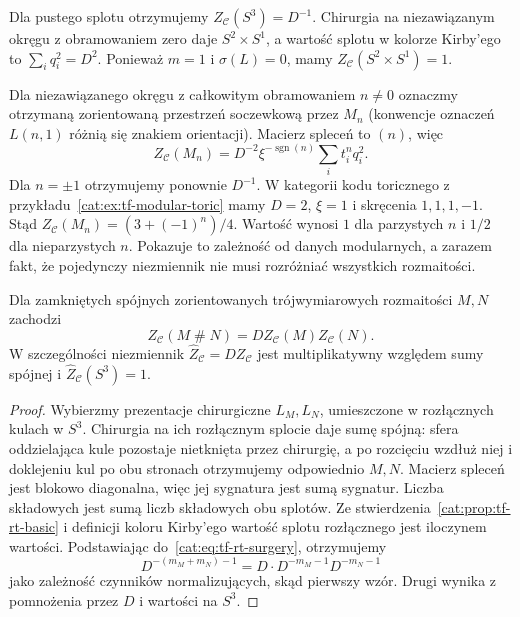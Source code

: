 \begin{przyklad}\label{cat:ex:tf-rt-lens}
Dla pustego splotu otrzymujemy $Z_{\mathcal C}(S^3)=D^{-1}$. Chirurgia na niezawiązanym okręgu z obramowaniem zero daje $S^2\times S^1$, a wartość splotu w kolorze Kirby'ego to $\sum_i q_i^2=D^2$. Ponieważ $m=1$ i $\sigma(L)=0$, mamy $Z_{\mathcal C}(S^2\times S^1)=1$.

Dla niezawiązanego okręgu z całkowitym obramowaniem $n\neq0$ oznaczmy otrzymaną zorientowaną przestrzeń soczewkową przez $M_n$ (konwencje oznaczeń $L(n,1)$ różnią się znakiem orientacji). Macierz spleceń to $(n)$, więc
\[
 Z_{\mathcal C}(M_n)=D^{-2}\xi^{-\operatorname{sgn}(n)}
 \sum_i t_i^n q_i^2.
\]
Dla $n=\pm1$ otrzymujemy ponownie $D^{-1}$. W kategorii kodu toricznego z przykładu~\ref{cat:ex:tf-modular-toric} mamy $D=2$, $\xi=1$ i skręcenia $1,1,1,-1$. Stąd
$Z_{\mathcal C}(M_n)=(3+(-1)^n)/4$.
Wartość wynosi $1$ dla parzystych $n$ i $1/2$ dla nieparzystych $n$. Pokazuje to zależność od danych modularnych, a zarazem fakt, że pojedynczy niezmiennik nie musi rozróżniać wszystkich rozmaitości.
\end{przyklad}

\begin{wniosek}\label{cat:cor:tf-rt-connected-sum}
Dla zamkniętych spójnych zorientowanych trójwymiarowych rozmaitości $M,N$ zachodzi
\[
 Z_{\mathcal C}(M\mathbin{\#}N)=D Z_{\mathcal C}(M)Z_{\mathcal C}(N).
\]
W szczególności niezmiennik $\widehat Z_{\mathcal C}=D Z_{\mathcal C}$ jest multiplikatywny względem sumy spójnej i $\widehat Z_{\mathcal C}(S^3)=1$.
\end{wniosek}
\begin{proof}
Wybierzmy prezentacje chirurgiczne $L_M,L_N$, umieszczone w rozłącznych kulach w $S^3$. Chirurgia na ich rozłącznym splocie daje sumę spójną: sfera oddzielająca kule pozostaje nietknięta przez chirurgię, a po rozcięciu wzdłuż niej i doklejeniu kul po obu stronach otrzymujemy odpowiednio $M,N$. Macierz spleceń jest blokowo diagonalna, więc jej sygnatura jest sumą sygnatur. Liczba składowych jest sumą liczb składowych obu splotów. Ze stwierdzenia~\ref{cat:prop:tf-rt-basic} i definicji koloru Kirby'ego wartość splotu rozłącznego jest iloczynem wartości. Podstawiając do~\eqref{cat:eq:tf-rt-surgery}, otrzymujemy
\[
 D^{-(m_M+m_N)-1}
 =D\cdot D^{-m_M-1}D^{-m_N-1}
\]
jako zależność czynników normalizujących, skąd pierwszy wzór. Drugi wynika z pomnożenia przez $D$ i wartości na $S^3$.
\end{proof}

